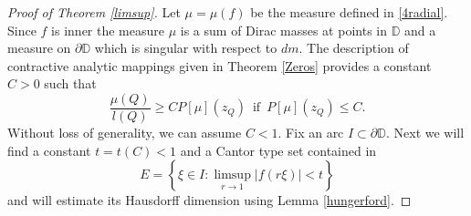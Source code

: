 \documentclass[a4paper,12pt]{article}
\theoremstyle{definition}
\numberwithin{equation}{section}
\newcommand{\D}{\mathbb D}
\begin{document}
\begin{proof}[Proof of Theorem \ref{limsup}]
    
Let $\mu=\mu(f)$ be the measure defined in \eqref{4radial}. Since $f$ is inner the measure $\mu$ is a sum of Dirac masses at points in $\D$ and a measure on $\partial \D$ which is singular with respect to $dm$. The description of contractive analytic mappings given in Theorem \ref{Zeros} provides a constant $C>0$ such that
\begin{equation}
    \label{5radial}
\frac{\mu(Q)}{l(Q)} \geqslant C P[\mu ] \left(z_{Q}\right) \, \text{ if } \, P[\mu]\left(z_{Q}\right) \leqslant C . 
\end{equation}
Without loss of generality, we can assume $C<1$. Fix an arc $I \subset \partial \D$. Next we will find a constant $t=t(C) < 1$ and a Cantor type set contained in 
$$
E= \left\{\xi \in I: \limsup_{r \rightarrow 1} |f(r\xi)|<t \right\}
$$ 
and will estimate its Hausdorff dimension using Lemma \ref{hungerford}. 


\end{proof}
\end{document}
